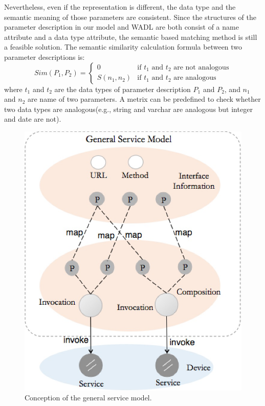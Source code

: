 Nevertheless, even if the representation is different, the data type and the semantic meaning of those parameters are consistent. Since the structures of the parameter description in our model and WADL are both consist of a name attribute and a data type attribute, the semantic based matching method is still a feasible solution. The semantic similarity calculation formula between two parameter descriptions is: 
\begin{equation}
    Sim(P_1, P_2)=
   \begin{cases}
   0 &\mbox{if $t_1$ and $t_2$ are not analogous}\\
   S(n_1, n_2) &\mbox{if $t_1$ and $t_2$ are analogous}
   \end{cases}
\end{equation}
where $t_1$ and $t_2$ are the data types of parameter description $P_1$ and $P_2$, and $n_1$ and $n_2$ are name of two parameters. A metrix can be predefined to check whether two data types are analogous(e.g., string and varchar are analogous but integer and date are not).

\begin{figure}[!b]
\centering
\includegraphics[width=1.0\linewidth]{./graph/generalservicemodel}
\caption{Conception of the general service model.}
\label{fig_generalservice}
\end{figure}

